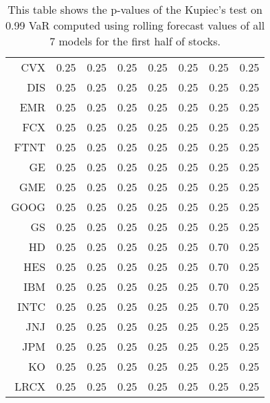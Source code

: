 \begin{table}[ht]
\begin{tabular}{rrrrrrrr}
  CVX & 0.25 & 0.25 & 0.25 & 0.25 & 0.25 & 0.25 & 0.25 \\ 
  DIS & 0.25 & 0.25 & 0.25 & 0.25 & 0.25 & 0.25 & 0.25 \\ 
  EMR & 0.25 & 0.25 & 0.25 & 0.25 & 0.25 & 0.25 & 0.25 \\ 
  FCX & 0.25 & 0.25 & 0.25 & 0.25 & 0.25 & 0.25 & 0.25 \\ 
  FTNT & 0.25 & 0.25 & 0.25 & 0.25 & 0.25 & 0.25 & 0.25 \\ 
  GE & 0.25 & 0.25 & 0.25 & 0.25 & 0.25 & 0.25 & 0.25 \\ 
  GME & 0.25 & 0.25 & 0.25 & 0.25 & 0.25 & 0.25 & 0.25 \\ 
  GOOG & 0.25 & 0.25 & 0.25 & 0.25 & 0.25 & 0.25 & 0.25 \\ 
  GS & 0.25 & 0.25 & 0.25 & 0.25 & 0.25 & 0.25 & 0.25 \\ 
  HD & 0.25 & 0.25 & 0.25 & 0.25 & 0.25 & 0.70 & 0.25 \\ 
  HES & 0.25 & 0.25 & 0.25 & 0.25 & 0.25 & 0.70 & 0.25 \\ 
  IBM & 0.25 & 0.25 & 0.25 & 0.25 & 0.25 & 0.70 & 0.25 \\ 
  INTC & 0.25 & 0.25 & 0.25 & 0.25 & 0.25 & 0.70 & 0.25 \\ 
  JNJ & 0.25 & 0.25 & 0.25 & 0.25 & 0.25 & 0.25 & 0.25 \\ 
  JPM & 0.25 & 0.25 & 0.25 & 0.25 & 0.25 & 0.25 & 0.25 \\ 
  KO & 0.25 & 0.25 & 0.25 & 0.25 & 0.25 & 0.25 & 0.25 \\ 
  LRCX & 0.25 & 0.25 & 0.25 & 0.25 & 0.25 & 0.25 & 0.25 \\ 
   \hline
\end{tabular}
\caption[Kupiec's test p-values, alpha =0.99 (1)]{This table shows the p-values of the Kupiec's test on 0.99 VaR computed using rolling forecast values of all 7 models for the first half of stocks.} 
\label{Table:Kupiec_test_rolling_0.99_1}
\end{table}

